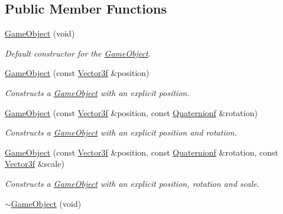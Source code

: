\subsection*{Public Member Functions}
\begin{DoxyCompactItemize}
\item 
\hyperlink{classsparky_1_1_game_object_a6741a688df44e18af24ac38445c2e009}{Game\+Object} (void)
\begin{DoxyCompactList}\small\item\em Default constructor for the \hyperlink{classsparky_1_1_game_object}{Game\+Object}. \end{DoxyCompactList}\item 
\hyperlink{classsparky_1_1_game_object_a8bb617ee3bafb00cc463d652307e2bfe}{Game\+Object} (const \hyperlink{classsparky_1_1_vector3}{Vector3f} \&position)
\begin{DoxyCompactList}\small\item\em Constructs a \hyperlink{classsparky_1_1_game_object}{Game\+Object} with an explicit position. \end{DoxyCompactList}\item 
\hyperlink{classsparky_1_1_game_object_a23b68bce39d6644622a62343d79aa014}{Game\+Object} (const \hyperlink{classsparky_1_1_vector3}{Vector3f} \&position, const \hyperlink{classsparky_1_1_quaternion}{Quaternionf} \&rotation)
\begin{DoxyCompactList}\small\item\em Constructs a \hyperlink{classsparky_1_1_game_object}{Game\+Object} with an explicit position and rotation. \end{DoxyCompactList}\item 
\hyperlink{classsparky_1_1_game_object_a563d3ad3403dc40f0bf7c0450b6d76e1}{Game\+Object} (const \hyperlink{classsparky_1_1_vector3}{Vector3f} \&position, const \hyperlink{classsparky_1_1_quaternion}{Quaternionf} \&rotation, const \hyperlink{classsparky_1_1_vector3}{Vector3f} \&scale)
\begin{DoxyCompactList}\small\item\em Constructs a \hyperlink{classsparky_1_1_game_object}{Game\+Object} with an explicit position, rotation and scale. \end{DoxyCompactList}\item 
\hyperlink{classsparky_1_1_game_object_ad1ce9f28fd2a1165a58432db1f505ca1}{$\sim$\+Game\+Object} (void)\hypertarget{classsparky_1_1_game_object_ad1ce9f28fd2a1165a58432db1f505ca1}{}\label{classsparky_1_1_game_object_ad1ce9f28fd2a1165a58432db1f505ca1}


\end{DoxyCompactItemize}
